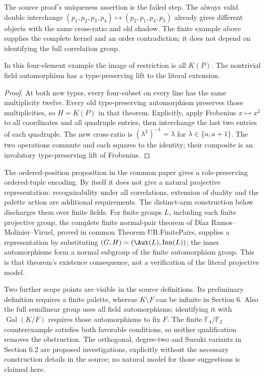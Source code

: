 The source proof's uniqueness assertion is the failed step. The always
valid double interchange
$(p_1,p_2,p_3,p_4)\mapsto(p_2,p_1,p_4,p_3)$ already gives different
objects with the same cross-ratio and old shadow. The finite example
above supplies the complete kernel and an order contradiction; it does
not depend on identifying the full correlation group.

\begin{proposition}
In this four-element example the image of restriction is all $K(P)$.
The nontrivial field automorphism has a type-preserving lift to the
literal extension.
\end{proposition}
\begin{proof}
At both new types, every four-subset on every line has the same
multiplicity twelve. Every old type-preserving automorphism preserves
those multiplicities, so $H=K(P)$ in that theorem. Explicitly,
apply Frobenius $x\mapsto x^2$ to all coordinates and all quadruple
entries, then interchange the last two entries of each quadruple.
The new cross-ratio is $(\lambda^2)^{-1}=\lambda$ for
$\lambda\in\{a,a+1\}$. The two operations commute and each squares
to the identity; their composite is an involutory type-preserving
lift of Frobenius.
\end{proof}

The ordered-position proposition in the common paper gives a role-preserving ordered-tuple
encoding. By itself it does not give a natural projective representation:
recognizability under all correlations, extension of duality and the palette
action are additional requirements. The distinct-arm construction below
discharges them over finite fields.
For finite groups $L$, including each finite projective group, the
complete finite normal-pair theorem of D\'iaz Ramos--Molinier--Viruel,
proved in common Theorem UR.FinitePairs, supplies a representation by substituting
$(G,H)=(\Aut(L),\operatorname{Inn}(L))$; the inner automorphisms form
a normal subgroup of the finite automorphism group. This is that theorem's
existence consequence, not a verification of the literal projective model.

Two further scope points are visible in the source definitions. Its
preliminary definition requires a finite palette, whereas $K\setminus F$
can be infinite in Section 6. Also the full semilinear group uses all
field automorphisms; identifying it with $\operatorname{Gal}(K/F)$
requires those automorphisms to fix $F$. The finite $\mathbb F_4/\mathbb F_2$
counterexample satisfies both favorable conditions, so neither
qualification removes the obstruction. The orthogonal, degree-two and
Suzuki variants in Section 6.2 are proposed investigations, explicitly
without the necessary construction details in the source; no natural
model for those suggestions is claimed here.

